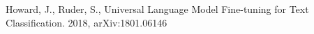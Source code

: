 \documentclass[12pt,german]{report}
\begin{document}

\newpage 
\thispagestyle{empty}
\quad 
\newpage

\tableofcontents
\newpage 
\thispagestyle{empty}
\quad 
\newpage


\newpage 
\thispagestyle{empty}
\quad 
\newpage



\listoffigures

\begin{thebibliography}{}
 Howard, J., Ruder, S., Universal Language Model Fine-tuning for Text Classification. 2018,  arXiv:1801.06146 
\end{thebibliography}
\end{document}
